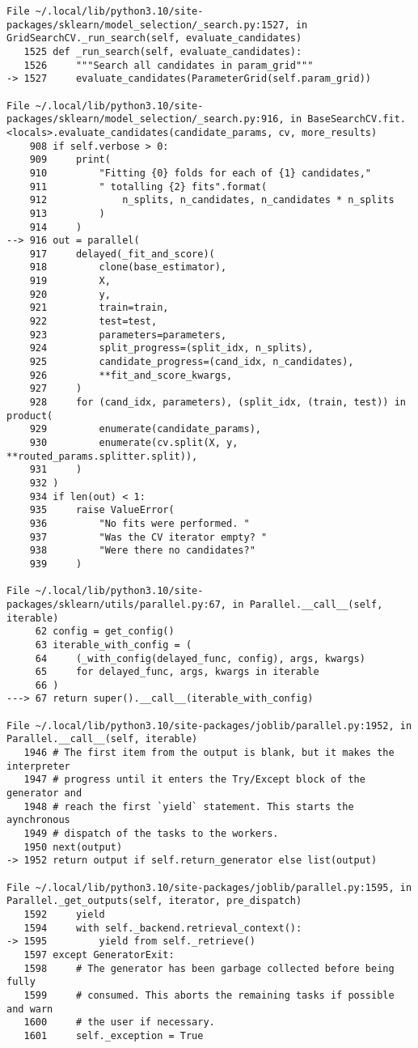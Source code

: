 \documentclass[
  english,
]{article}
\begin{document}
\begin{verbatim}
File ~/.local/lib/python3.10/site-packages/sklearn/model_selection/_search.py:1527, in GridSearchCV._run_search(self, evaluate_candidates)
   1525 def _run_search(self, evaluate_candidates):
   1526     """Search all candidates in param_grid"""
-> 1527     evaluate_candidates(ParameterGrid(self.param_grid))

File ~/.local/lib/python3.10/site-packages/sklearn/model_selection/_search.py:916, in BaseSearchCV.fit.<locals>.evaluate_candidates(candidate_params, cv, more_results)
    908 if self.verbose > 0:
    909     print(
    910         "Fitting {0} folds for each of {1} candidates,"
    911         " totalling {2} fits".format(
    912             n_splits, n_candidates, n_candidates * n_splits
    913         )
    914     )
--> 916 out = parallel(
    917     delayed(_fit_and_score)(
    918         clone(base_estimator),
    919         X,
    920         y,
    921         train=train,
    922         test=test,
    923         parameters=parameters,
    924         split_progress=(split_idx, n_splits),
    925         candidate_progress=(cand_idx, n_candidates),
    926         **fit_and_score_kwargs,
    927     )
    928     for (cand_idx, parameters), (split_idx, (train, test)) in product(
    929         enumerate(candidate_params),
    930         enumerate(cv.split(X, y, **routed_params.splitter.split)),
    931     )
    932 )
    934 if len(out) < 1:
    935     raise ValueError(
    936         "No fits were performed. "
    937         "Was the CV iterator empty? "
    938         "Were there no candidates?"
    939     )

File ~/.local/lib/python3.10/site-packages/sklearn/utils/parallel.py:67, in Parallel.__call__(self, iterable)
     62 config = get_config()
     63 iterable_with_config = (
     64     (_with_config(delayed_func, config), args, kwargs)
     65     for delayed_func, args, kwargs in iterable
     66 )
---> 67 return super().__call__(iterable_with_config)

File ~/.local/lib/python3.10/site-packages/joblib/parallel.py:1952, in Parallel.__call__(self, iterable)
   1946 # The first item from the output is blank, but it makes the interpreter
   1947 # progress until it enters the Try/Except block of the generator and
   1948 # reach the first `yield` statement. This starts the aynchronous
   1949 # dispatch of the tasks to the workers.
   1950 next(output)
-> 1952 return output if self.return_generator else list(output)

File ~/.local/lib/python3.10/site-packages/joblib/parallel.py:1595, in Parallel._get_outputs(self, iterator, pre_dispatch)
   1592     yield
   1594     with self._backend.retrieval_context():
-> 1595         yield from self._retrieve()
   1597 except GeneratorExit:
   1598     # The generator has been garbage collected before being fully
   1599     # consumed. This aborts the remaining tasks if possible and warn
   1600     # the user if necessary.
   1601     self._exception = True


\end{verbatim}
\end{document}
